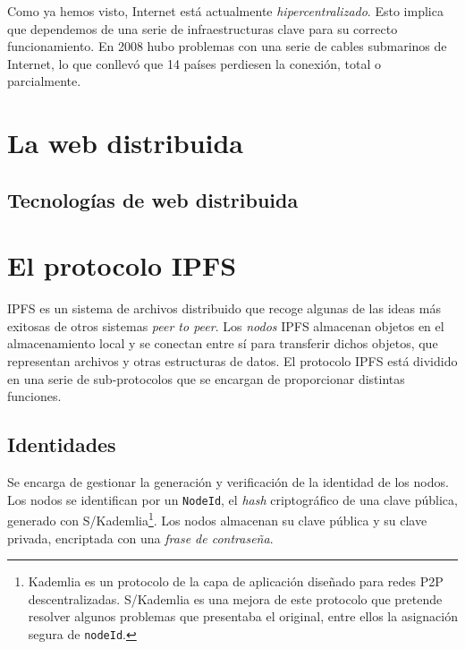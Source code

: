 \documentclass[12pt]{article} %
\begin{document}
Como ya hemos visto, Internet está actualmente \textit{hipercentralizado}. Esto implica que dependemos de una serie de infraestructuras clave para su correcto funcionamiento. En 2008 hubo problemas con una serie de cables submarinos de Internet, lo que conllevó que 14 países perdiesen la conexión, total o parcialmente\cite{2008-cable-disruption}.



\section{La web distribuida} %
\label{sec:la_web_distribuida}

\subsection{Tecnologías de web distribuida} %
\label{sub:tecnologías_de_web_distribuida}



\section{El protocolo IPFS} %
\label{sec:el_protocolo_ipfs}

IPFS es un sistema de archivos distribuido que recoge algunas de las ideas más exitosas de otros sistemas \textit{peer to peer}. Los \textit{nodos} IPFS almacenan objetos en el almacenamiento local y se conectan entre sí para transferir dichos objetos, que representan archivos y otras estructuras de datos. El protocolo IPFS está dividido en una serie de sub-protocolos que se encargan de proporcionar distintas funciones.

\subsection{Identidades} %
\label{sub:identidades}

Se encarga de gestionar la generación y verificación de la identidad de los nodos. Los nodos se identifican por un \texttt{NodeId}, el \textit{hash} criptográfico de una clave pública, generado con S/Kademlia\footnote{Kademlia es un protocolo de la capa de aplicación diseñado para redes P2P descentralizadas. S/Kademlia es una mejora de este protocolo que pretende resolver algunos problemas que presentaba el original, entre ellos la asignación segura de \texttt{nodeId}\cite{S/Kamdelia}.}. Los nodos almacenan su clave pública y su clave privada, encriptada con una \textit{frase de contraseña}.
\end{document}

